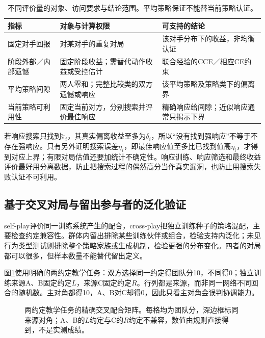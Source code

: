 \begin{table}[htbp]
 \centering
 \begin{tabularx}{\linewidth}{@{}l >{\raggedright\arraybackslash}X >{\raggedright\arraybackslash}X@{}}
 \toprule
 指标 & 对象与计算权限 & 可支持的结论\\
 \midrule
 固定对手回报 & 对某对手的重复对局 & 该对手分布下的收益，非均衡认证\\
 阶段外部／内部遗憾 & 固定阶段收益；需替代动作收益或受控估计 & 联合经验的CCE／相应CE约束\\
 平均策略间隙 & 两人零和；完整比较类的双方遗憾或响应 & 该平均策略及策略类下的偏离界\\
 当前策略可利用性 & 固定当前对方，分别搜索并评价最佳响应 & 精确响应给间隙；近似响应通常只揭示下界\\
 \bottomrule
 \end{tabularx}
 \caption{不同评价量的对象、访问要求与结论范围。平均策略保证不能替当前策略认证。}
 \label{tab:rl-multi-agent-guarantees}
\end{table}

若响应搜索只找到$\tilde\pi_i$，其真实偏离收益至多为$\delta_i$，所以“没有找到强响应”不等于不存在强响应。只有另外证明搜索误差$\eta_i$，即最佳响应值至多比已找到值高$\eta_i$，才得到对应上界；有限对局估值还要加统计不确定性。响应训练、响应筛选和最终收益评价最好用分离数据，防止把搜索过程的偶然高分当作真实漏洞，也防止用搜索失败认证不可利用。

\subsection{基于交叉对局与留出参与者的泛化验证}
\label{sec:rl-multi-agent-cross-play}

self-play评价同一训练系统产生的配合，cross-play把独立训练种子的策略混配，主要检查约定兼容性。群体内留出排除某些训练伙伴或组合，检验支持内泛化；未见行为类型测试则排除整个策略家族或生成机制，检验更强的分布变化。四者的对局都可以很多，但样本数量不能替代留出定义。

图\ref{fig:rl-multi-agent-cross-play}使用明确的两约定教学任务：双方选择同一约定得团队分10，不同得0；独立训练来源A、B固定约定$L$，来源C固定约定$R$。行列都是来源，而非同一网络不同回合的随机数。主对角都得10，A、B对C却得0，因此只看主对角会误判协调能力。

\begin{figure}[htbp]
 \centering
 
 \caption{两约定教学任务的精确交叉配合矩阵。每格均为团队分，深边框标同来源对角；A、B的$L$约定与C的$R$约定不兼容，数值由规则直接得到，不是实测成绩。}
 \label{fig:rl-multi-agent-cross-play}
\end{figure}

